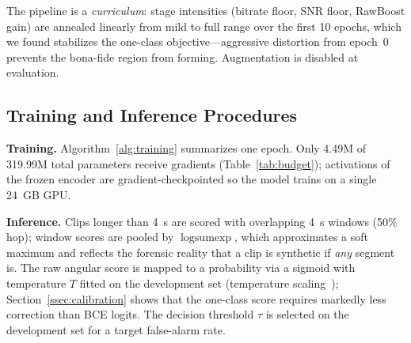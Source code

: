 The pipeline is a \emph{curriculum}: stage intensities (bitrate floor, SNR floor,
RawBoost gain) are annealed linearly from mild to full range over the first 10 epochs,
which we found stabilizes the one-class objective---aggressive distortion from epoch~0
prevents the bona-fide region from forming. Augmentation is disabled at evaluation.

\subsection{Training and Inference Procedures}
\label{ssec:trainproc}

\begin{algorithm}[t]
\caption{AuralGuard training (one epoch)}
\label{alg:training}
\footnotesize
{}
\end{algorithm}

\noindent\textbf{Training.} Algorithm~\ref{alg:training} summarizes one epoch. Only
4.49M of 319.99M total parameters receive gradients (Table~\ref{tab:budget});
activations of the frozen encoder are gradient-checkpointed so the model trains on a
single 24~GB GPU.

\noindent\textbf{Inference.} Clips longer than 4~s are scored with overlapping 4~s
windows (50\% hop); window scores are pooled by $\operatorname{logsumexp}$, which
approximates a soft maximum and reflects the forensic reality that a clip is synthetic
if \emph{any} segment is. The raw angular score is mapped to a probability via a
sigmoid with temperature $T$ fitted on the development set (temperature
scaling~\cite{guo2017calibration}); Section~\ref{ssec:calibration} shows that the
one-class score requires markedly less correction than BCE logits. The decision
threshold $\tau$ is selected on the development set for a target false-alarm rate.

